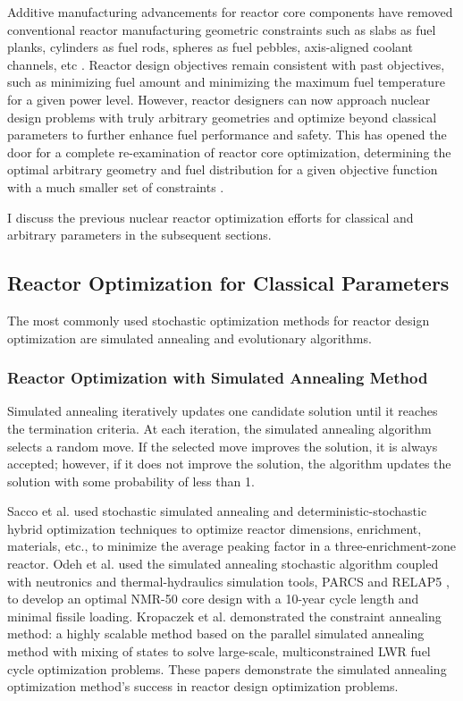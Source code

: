 Additive manufacturing advancements for reactor core components have
removed conventional reactor manufacturing geometric constraints such as slabs as fuel 
planks, cylinders as fuel rods, spheres as fuel pebbles, axis-aligned coolant 
channels, etc  \cite{sobes_artificial_2020}.
Reactor design objectives remain consistent with past objectives, such as 
minimizing fuel amount and minimizing the maximum fuel temperature for a given 
power level.
However, reactor designers can now approach nuclear design problems with truly 
arbitrary geometries and optimize beyond classical parameters to further enhance 
fuel performance and safety.
This has opened the door for a complete re-examination of reactor core 
optimization, determining the optimal arbitrary geometry 
and fuel distribution for a given objective function with a much smaller set of 
constraints \cite{sobes_artificial_2020}. 

I discuss the previous nuclear reactor optimization efforts for classical and 
arbitrary parameters in the subsequent sections.

\subsection{Reactor Optimization for Classical Parameters}
The most commonly used stochastic optimization methods for reactor design 
optimization are simulated annealing and evolutionary algorithms. 

\subsubsection{Reactor Optimization with Simulated Annealing Method}
Simulated annealing iteratively updates one candidate solution until it reaches 
the termination criteria. 
At each iteration, the simulated annealing algorithm selects a random move. 
If the selected move improves the solution, it is always accepted; however,  
if it does not improve the solution, the algorithm updates the solution with 
some probability of less than 1.

Sacco et al. \cite{sacco_two_2006,sacco_metropolis_2008} used stochastic 
simulated annealing and deterministic-stochastic hybrid optimization techniques 
to optimize reactor dimensions, enrichment, materials, etc., to 
minimize the average peaking factor in a three-enrichment-zone reactor. 
Odeh et al. \cite{odeh_core_2016} used the simulated annealing stochastic algorithm 
coupled with neutronics and thermal-hydraulics simulation tools, \gls{PARCS} and RELAP5
\cite{fletcher_relap5mod3_1992}, to develop an optimal \gls{NMR-50} core design 
with a 10-year cycle length and minimal fissile loading. 
Kropaczek et al. \cite{kropaczek_large-scale_2019} demonstrated the constraint 
annealing method: a highly scalable method based on the parallel simulated annealing 
method with mixing of states \cite{kropaczek_constraint_2019} to solve large-scale, 
multiconstrained \gls{LWR} fuel cycle optimization problems. 
These papers demonstrate the simulated annealing optimization method's success in 
reactor design optimization problems. 

